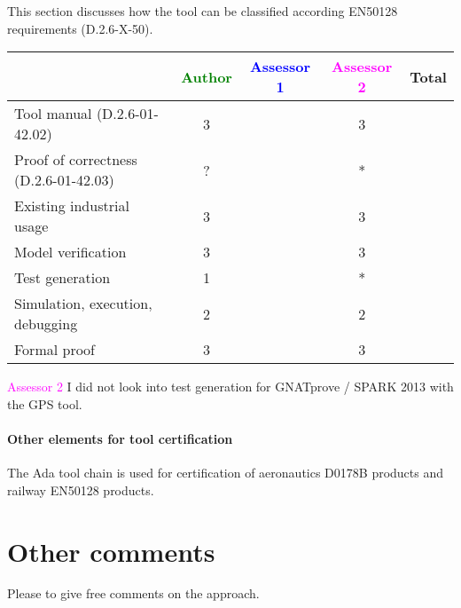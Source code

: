 This section discusses how the tool can be classified according EN50128 requirements (D.2.6-X-50).


\begin{tabular}{|l | c | c | c | c|}
\hline
& \textcolor{green}{Author} & \textcolor{blue}{Assessor 1} & \textcolor{magenta}{Assessor 2} & Total \\
\hline 
Tool manual (D.2.6-01-42.02) & 3 & & 3 &  \\
\hline
Proof of correctness (D.2.6-01-42.03)   & ? & & * & \\
\hline
Existing industrial  usage  & 3 &  & 3 & \\
\hline
Model verification & 3 & & 3 & \\
\hline
Test generation & 1 & & * & \\
\hline
Simulation, execution, debugging & 2 & & 2 & \\
\hline
Formal proof & 3 & & 3 & \\
\hline
\end{tabular}

\textcolor{magenta}{Assessor 2} I did not look into test generation for
GNATprove / SPARK 2013 with the GPS tool.

\paragraph{Other elements for tool certification}


The Ada tool chain is used for certification of aeronautics D0178B
products and railway EN50128 products.

\section{Other comments}
Please to  give free comments on the approach.



